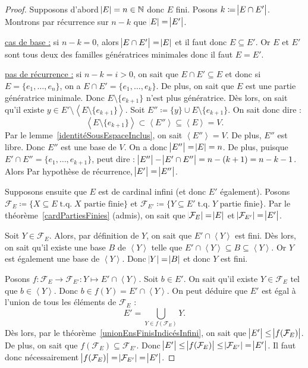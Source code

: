 \documentclass{article}
\DeclareMathOperator{\tq}{\text{ t.q. }}
\newcommand{\N}{\mathbb N}
\newcommand{\eng}[1]{\left\langle#1\right\rangle}
\theoremstyle{definition}
\theoremstyle{remark}
\begin{document}
		\begin{proof} Supposons d'abord $\abs E = n \in \N$ donc $E$ fini. Posons $k \coloneqq \abs {E \cap E'}$. Montrons par récurrence sur $n-k$ que $\abs E = \abs {E'}$.
		
		\underline{cas de base :} si $n-k = 0$, alors $\abs {E \cap E'} = \abs {E}$ et il faut donc $E \subseteq E'$. Or $E$ et $E'$ sont tous deux des familles génératrices
		minimales donc il faut $E = E'$.

		\underline {pas de récurrence :} si $n-k = i > 0$, on sait que $E \cap E' \subseteq E$ et donc si $E = \{e_1, \ldots, e_n\}$, on a $E \cap E' = \{e_1, \ldots, e_k\}$.
		De plus, on sait que $E$ est une partie génératrice minimale. Donc $E \setminus \{e_{k+1}\}$ n'est plus génératrice. Dès lors, on sait qu'il existe
		$y \in E' \setminus \eng {E \setminus \{e_{k+1}\}}$. Soit $E'' \coloneqq \{y\} \cup E \setminus \{e_{k+1}\}$. On sait donc dire :
		\[\eng {E \setminus \{e_{k+1}\}} \subset \eng {E''} \subseteq \eng E = V.\] Par le lemme~\ref{identitéSousEspaceInclus}, on sait $\eng {E''} = V$. De plus, $E''$
		est libre. Donc $E''$ est une base de $V$. On a donc $\abs {E''} = \abs E = n$. De plus, puisque $E' \cap E'' = \{e_1, \ldots, e_{k+1}\}$, peut dire :
		$\abs {E''} - \abs {E' \cap E''} = n - (k+1) = n-k-1$. Alors Par hypothèse de récurrence, $\abs {E'} = \abs {E''}$.

		Supposons ensuite que $E$ est de cardinal infini (et donc $E'$ également). Posons $\mathcal F_E \coloneqq \{X \subseteq E \tq X \text{ partie finie}\}$ et
		$\mathcal F_{E'} \coloneqq \{Y \subseteq E' \tq Y \text{ partie finie}\}$. Par le théorème~\ref{cardPartiesFinies} (admis), on sait que $\abs {\mathcal F_E} = \abs E$
		et $\abs {\mathcal F_{E'}} = \abs {E'}$.

		Soit $Y \in \mathcal F_E$. Alors, par définition de $Y$, on sait que $E' \cap \eng Y$ est fini. Dès lors, on sait qu'il existe une base $B$ de $\eng Y$ telle que
		$E' \cap \eng Y \subseteq B \subseteq \eng Y$. Or $Y$ est également une base de $\eng Y$. Donc $\abs Y = \abs B$ et donc $Y$ est fini.

		Posons $f : \mathcal F_E \to \mathcal F_{E'} : Y \mapsto E' \cap \eng Y$. Soit $b \in E'$. On sait qu'il existe $Y \in \mathcal F_E$ tel que $b \in \eng Y$.
		Donc $b \in f(Y) = E' \cap \eng Y$. On peut déduire que $E'$ est égal à l'union de tous les éléments de $\mathcal F_E$ :
		\[E' = \bigcup_{Y \in f(\mathcal F_E)}Y.\] Dès lors, par le théorème~\ref{unionEnsFinisIndicésInfini}, on sait que $\abs {E'} \leq \abs {f(\mathcal F_E)}$.
		De plus, on sait que $f(\mathcal F_E) \subseteq \mathcal F_{E'}$. Donc $\abs {E'} \leq \abs {f(\mathcal F_E)} \leq \abs {\mathcal F_{E'}} = \abs {E'}$.
		Il faut donc nécessairement $\abs {f(\mathcal F_{E})} = \abs {\mathcal F_{E'}} = \abs {E'}$.


\end{proof}
\end{document}
